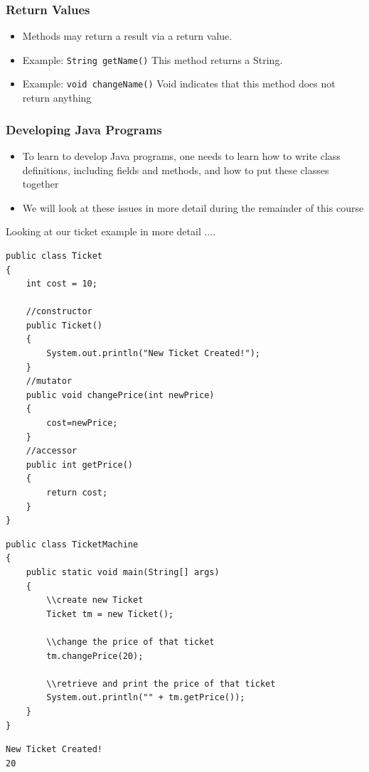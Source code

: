\documentclass{beamer}
\begin{document}
\begin{frame}
\frametitle{Return Values}
\begin{itemize}
\item Methods may return a result via a \alert{return value}.
\item Example: \lstinline!String getName()‏!
This method returns a String.
\item Example: \lstinline!void changeName()‏!
\alert{Void} indicates that this method does not return anything
\end{itemize}
\end{frame}

\begin{frame}
\frametitle{Developing Java Programs}
\begin{itemize}
\item To learn to develop Java programs, one needs to learn how to write class definitions, including fields and methods, and how to put these classes together
\item We will look at these issues in more detail during the remainder of this course
\end{itemize}
\end{frame}

\begin{frame}
Looking at our ticket example in more detail ....
\end{frame}

\begin{frame}[fragile]
\begin{block}{}
\tiny
\begin{lstlisting}
public class Ticket
{
    int cost = 10;
    
    //constructor
    public Ticket()
    {
        System.out.println("New Ticket Created!");
    } 
    //mutator
    public void changePrice(int newPrice)
    {
        cost=newPrice;
    } 
    //accessor
    public int getPrice()
    {
        return cost;
    }
}
\end{lstlisting}
\end{block}
\end{frame}

\begin{frame}[fragile]
\begin{block}{}
\begin{lstlisting}
public class TicketMachine
{
    public static void main(String[] args)
    {
    	\\create new Ticket
        Ticket tm = new Ticket();
        
        \\change the price of that ticket
        tm.changePrice(20);
        
        \\retrieve and print the price of that ticket
        System.out.println("" + tm.getPrice());
    }
}
\end{lstlisting}
\end{block}
\begin{block}{}
\begin{lstlisting}
New Ticket Created!
20
\end{lstlisting}
\end{block}
\end{frame}
\end{document}
